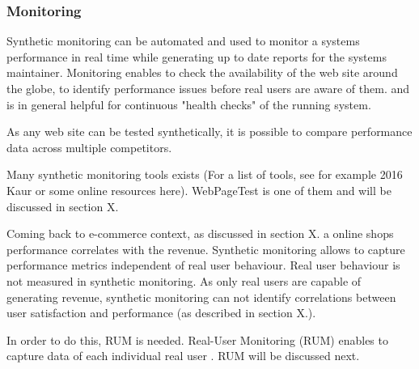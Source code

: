 \subsubsection{Monitoring}


Synthetic monitoring can be automated and used to monitor a systems performance in real time while generating up to date reports for the systems maintainer. %
Monitoring enables to check the availability of the web site around the globe, %
to identify performance issues before real users are aware of them. %
and is in general helpful for continuous "health checks" of the running system. %

As any web site can be tested synthetically, it is possible to compare performance data across multiple competitors. %



Many synthetic monitoring tools exists (For a list of tools, see for example 2016 Kaur or some online resources here).
WebPageTest is one of them and will be discussed in section X.



Coming back to e-commerce context, as discussed in section X.  a online shops performance correlates with the revenue.
Synthetic monitoring allows to capture performance metrics independent of real user behaviour.
Real user behaviour is not measured in synthetic monitoring.
As only real users are capable of generating revenue, synthetic monitoring can not identify correlations between user satisfaction and performance (as described in section X.).%

In order to do this, RUM is needed.
Real-User Monitoring (RUM) enables to capture data of each individual real user .
RUM will be discussed next.








